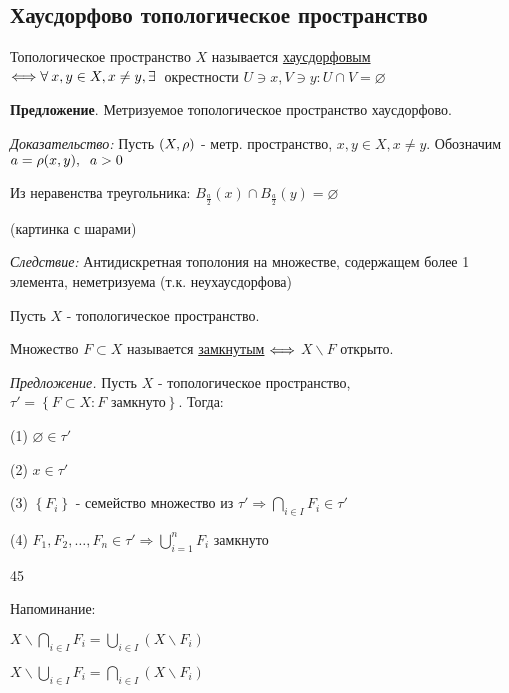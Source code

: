 \documentclass[../../main.tex]{subfiles}
\begin{document}
\subsection{Хаусдорфово топологическое пространство}


Топологическое пространство $X$ называется \underline{хаусдорфовым} $\Longleftrightarrow \forall\: x, y \in X, x \neq y, \exists\:$ окрестности $U \ni x, V \ni y \colon U \cap V = \varnothing$

\textbf{Предложение}. Метризуемое топологическое пространство хаусдорфово.

\textit{Доказательство:} Пусть $\left(X, \rho \right)$ - метр. пространство, $x, y \in X, x \neq y$. Обозначим $a = \rho(x, y),\;\; a > 0$

\begin{minipage}{0.8\linewidth}
Из неравенства треугольника: $B_{\frac a 2}(x) \cap B_{\frac a 2}(y) = \varnothing$
\end{minipage}
\begin{minipage}{0.2\linewidth}
(картинка с шарами)
\end{minipage}

\textit{Следствие:} Антидискретная тополония на множестве, содержащем более 1 элемента, неметризуема (т.к. неухаусдорфова)

 Пусть $X$ - топологическое пространство.

Множество $F \subset X$ называется \underline{замкнутым} $\Longleftrightarrow$ $X \backslash F$ открыто.

\begin{minipage}{0.8\linewidth}
\textit{Предложение.} Пусть $X$ - топологическое пространство, $\tau' = \left\{ F \subset X: F \text{ замкнуто} \right\}$. Тогда:

(1) $\varnothing \in \tau'$

(2) $x \in \tau'$

(3) $\left\{ F_i \right\}$ - семейство множество из $\tau' \Rightarrow \bigcap_{i \in I} F_i \in \tau'$

(4) $F_1, F_2, \ldots, F_n \in \tau' \Rightarrow \bigcup^n_{i = 1} F_i$ замкнуто
\end{minipage}45
\begin{minipage}{0.2\linewidth}
Напоминание:

$X \backslash \bigcap_{i \in I} F_i = \bigcup_{i \in I}\left( X \backslash F_i \right)$

$X \backslash \bigcup_{i \in I} F_i = \bigcap_{i \in I}\left( X \backslash F_i \right)$

\end{minipage}
\end{document}
